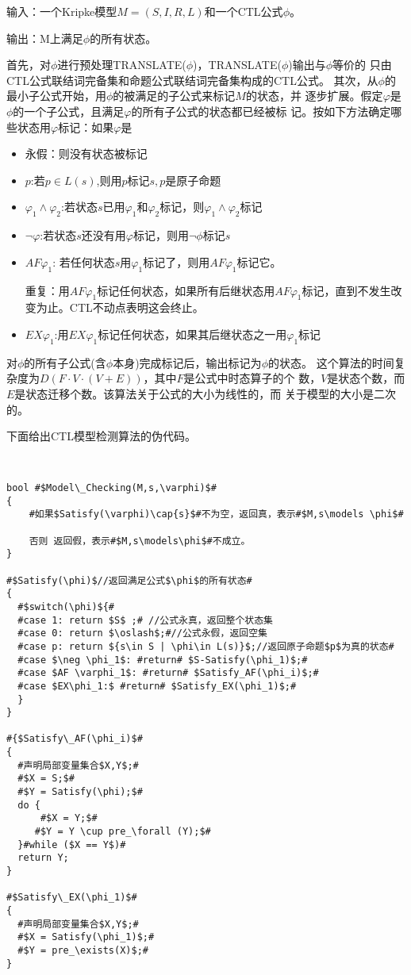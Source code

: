 输入：一个Kripke模型$M=(S,I,R,L)$和一个CTL公式$\phi$。

输出：M上满足$\phi$的所有状态。

首先，对$\phi$进行预处理TRANSLATE($\phi$)，TRANSLATE($\phi$)输出与$\phi$等价的
只由CTL公式联结词完备集和命题公式联结词完备集构成的CTL公式。
其次，从$\phi$的最小子公式开始，用$\phi$的被满足的子公式来标记$M$的状态，并
逐步扩展。假定$\varphi$是$\phi$的一个子公式，且满足$\varphi$的所有子公式的状态都已经被标
记。按如下方法确定哪些状态用$\varphi$标记：如果$\varphi$是
\begin{itemize}
\item 永假：则没有状态被标记
\item $p$:若$p\in L(s)$,则用$p$标记$s,p$是原子命题
\item $\varphi_1 \wedge \varphi_2$:若状态$s$已用$\varphi_1$和$\varphi_2$标记，则$\varphi_1 \wedge \varphi_2$标记
\item $\neg \varphi$:若状态$s$还没有用$\varphi$标记，则用$\neg\phi$标记$s$
\item $AF \varphi_1$:
若任何状态$s$用$\varphi_1$标记了，则用$AF\varphi_1$标记它。

重复：用$AF\varphi_1$标记任何状态，如果所有后继状态用$AF\varphi_1$标记，直到不发生改变为止。CTL不动点表明这会终止。

\item $EX\varphi_1$:用$EX \varphi_1$标记任何状态，如果其后继状态之一用$\varphi_1$标记
\end{itemize}
对$\phi$的所有子公式(含$\phi$本身)完成标记后，输出标记为$\phi$的状态。
这个算法的时间复杂度为$D(F·V·(V+E))$，其中$F$是公式中时态算子的个
数，$V$是状态个数，而$E$是状态迁移个数。该算法关于公式的大小为线性的，而
关于模型的大小是二次的。

下面给出CTL模型检测算法的伪代码。


   \begin{lstlisting}[escapechar=\#]


bool #$Model\_Checking(M,s,\varphi)$#
{
    #如果$Satisfy(\varphi)\cap{s}$#不为空，返回真，表示#$M,s\models \phi$#

    否则 返回假，表示#$M,s\models\phi$#不成立。
}

#$Satisfy(\phi)$//返回满足公式$\phi$的所有状态#
{
  #$switch(\phi)${#
  #case 1: return $S$ ;# //公式永真，返回整个状态集
  #case 0: return $\oslash$;#//公式永假，返回空集
  #case p: return ${s\in S | \phi\in L(s)}$;//返回原子命题$p$为真的状态#
  #case $\neg \phi_1$: #return# $S-Satisfy(\phi_1)$;#
  #case $AF \varphi_1$: #return# $Satisfy_AF(\phi_i)$;#
  #case $EX\phi_1:$ #return# $Satisfy_EX(\phi_1)$;#
  }
}

#{$Satisfy\_AF(\phi_i)$#
{
  #声明局部变量集合$X,Y$;#
  #$X = S;$#
  #$Y = Satisfy(\phi);$#
  do {
      #$X = Y;$#
     #$Y = Y \cup pre_\forall (Y);$#
  }#while ($X == Y$)#
  return Y;
}

#$Satisfy\_EX(\phi_1)$#
{
  #声明局部变量集合$X,Y$;#
  #$X = Satisfy(\phi_1)$;#
  #$Y = pre_\exists(X)$;#
}
\end{lstlisting}

